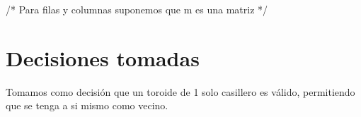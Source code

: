 \documentclass[a4paper]{article}
\begin{document}
/* Para filas y columnas suponemos que m es una matriz */\\



\section{Decisiones tomadas}
Tomamos como decisión que un toroide de 1 solo casillero es válido, permitiendo que se tenga a si mismo como vecino.
\end{document}
